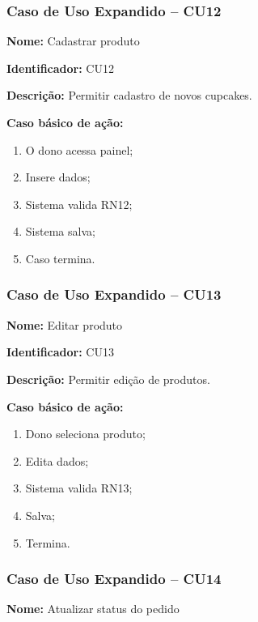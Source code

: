 \documentclass[12pt]{article}
\begin{document}

\subsubsection{Caso de Uso Expandido -- CU12}

\textbf{Nome:} Cadastrar produto

\textbf{Identificador:} CU12

\textbf{Descrição:} Permitir cadastro de novos cupcakes.

\textbf{Caso básico de ação:}
\begin{enumerate}
\item O dono acessa painel;
\item Insere dados;
\item Sistema valida RN12;
\item Sistema salva;
\item Caso termina.
\end{enumerate}


\subsubsection{Caso de Uso Expandido -- CU13}

\textbf{Nome:} Editar produto

\textbf{Identificador:} CU13

\textbf{Descrição:} Permitir edição de produtos.

\textbf{Caso básico de ação:}
\begin{enumerate}
\item Dono seleciona produto;
\item Edita dados;
\item Sistema valida RN13;
\item Salva;
\item Termina.
\end{enumerate}


\subsubsection{Caso de Uso Expandido -- CU14}

\textbf{Nome:} Atualizar status do pedido
\end{document}

